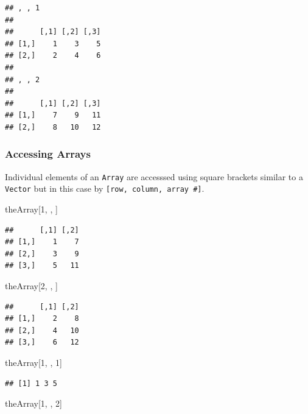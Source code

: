 \documentclass[]{book}
\newenvironment{Shaded}{\begin{snugshade}}{\end{snugshade}}
\newcommand{\DecValTok}[1]{\textcolor[rgb]{0.00,0.00,0.81}{#1}}
\newcommand{\NormalTok}[1]{#1}
\theoremstyle{definition}
\theoremstyle{definition}
\theoremstyle{definition}
\theoremstyle{remark}
\begin{document}
\begin{verbatim}
## , , 1
## 
##      [,1] [,2] [,3]
## [1,]    1    3    5
## [2,]    2    4    6
## 
## , , 2
## 
##      [,1] [,2] [,3]
## [1,]    7    9   11
## [2,]    8   10   12
\end{verbatim}

\hypertarget{accessing-arrays}{%
\subsubsection{Accessing Arrays}\label{accessing-arrays}}

Individual elements of an \texttt{Array} are accesssed using square
brackets similar to a \texttt{Vector} but in this case by
\texttt{{[}row,\ column,\ array\ \#{]}}.

\begin{Shaded}
\begin{Highlighting}[]
\NormalTok{theArray[}\DecValTok{1}\NormalTok{, , ]}
\end{Highlighting}
\end{Shaded}

\begin{verbatim}
##      [,1] [,2]
## [1,]    1    7
## [2,]    3    9
## [3,]    5   11
\end{verbatim}

\begin{Shaded}
\begin{Highlighting}[]
\NormalTok{theArray[}\DecValTok{2}\NormalTok{, , ]}
\end{Highlighting}
\end{Shaded}

\begin{verbatim}
##      [,1] [,2]
## [1,]    2    8
## [2,]    4   10
## [3,]    6   12
\end{verbatim}

\begin{Shaded}
\begin{Highlighting}[]
\NormalTok{theArray[}\DecValTok{1}\NormalTok{, , }\DecValTok{1}\NormalTok{]}
\end{Highlighting}
\end{Shaded}

\begin{verbatim}
## [1] 1 3 5
\end{verbatim}

\begin{Shaded}
\begin{Highlighting}[]
\NormalTok{theArray[}\DecValTok{1}\NormalTok{, , }\DecValTok{2}\NormalTok{]}
\end{Highlighting}
\end{Shaded}
\end{document}
